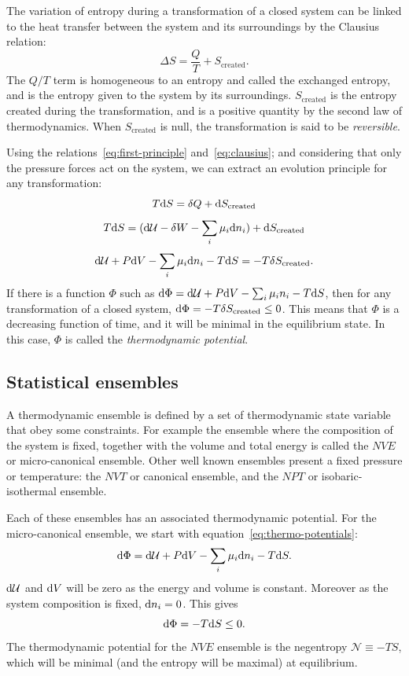 \documentclass[thesis]{subfiles}
\begin{document}
The variation of entropy during a transformation of a closed system can be
linked to the heat transfer between the system and its surroundings by the
Clausius relation:
\[\Delta S = \frac Q T + S_\text{created}. \label{eq:clausius}\]
The $Q/T$ term is homogeneous to an entropy and called the exchanged entropy,
and is the entropy given to the system by its surroundings. $S_\text{created}$
is the entropy created during the transformation, and is a positive quantity by
the second law of thermodynamics. When $S_\text{created}$ is null, the
transformation is said to be \emph{reversible}.

Using the relations~\eqref{eq:first-principle} and~\eqref{eq:clausius}; and
considering that only the pressure forces act on the system, we can extract an
evolution principle for any transformation:
\[T \text{d} S = \delta Q + \text{d} S_\text{created}\]
\[T \text{d} S = (\text{d} \mathcal{U} - \delta W - \sum_i \mu_i \text{d} n_i) + \text{d} S_\text{created}\]
\[\text{d} \mathcal{U} + P \text{d} V  - \sum_i \mu_i \text{d} n_i - T \text{d} S = -T\delta S_\text{created}.\label{eq:thermo-potentials}\]
If there is a function $\Phi$ such as $\text{d} \Phi = \text{d} \mathcal{U} + P \text{d} V - \sum_i \mu_i
n_i - T \text{d} S$, then for any transformation of a closed system, $\text{d} \Phi =
-T\delta S_\text{created} \leq 0$. This means that $\Phi$ is a decreasing
function of time, and it will be minimal in the equilibrium state. In this case,
$\Phi$ is called the \emph{thermodynamic potential}.

\subsection{Statistical ensembles}

A thermodynamic ensemble is defined by a set of thermodynamic state variable
that obey some constraints. For example the ensemble where the composition of
the system is fixed, together with the volume and total energy is called the
$NVE$ or micro-canonical ensemble. Other well known ensembles present a fixed
pressure or temperature: the $NVT$ or canonical ensemble, and the $NPT$ or
isobaric-isothermal ensemble.

Each of these ensembles has an associated thermodynamic potential. For the
micro-canonical ensemble, we start with equation~\eqref{eq:thermo-potentials}:
\[\text{d} \Phi = \text{d} \mathcal{U} + P \text{d} V - \sum_i \mu_i \text{d} n_i - T \text{d} S.\]
$\text{d} \mathcal{U}$ and $\text{d} V$ will be zero as the energy and volume is constant.
Moreover as the system composition is fixed, $\text{d} n_i = 0$. This gives
\[\text{d} \Phi = - T \text{d} S \leq 0.\]
The thermodynamic potential for the $NVE$ ensemble is the negentropy
$\mathcal{N} \equiv -TS$, which will be minimal (and the entropy will be
maximal) at equilibrium.
\end{document}
